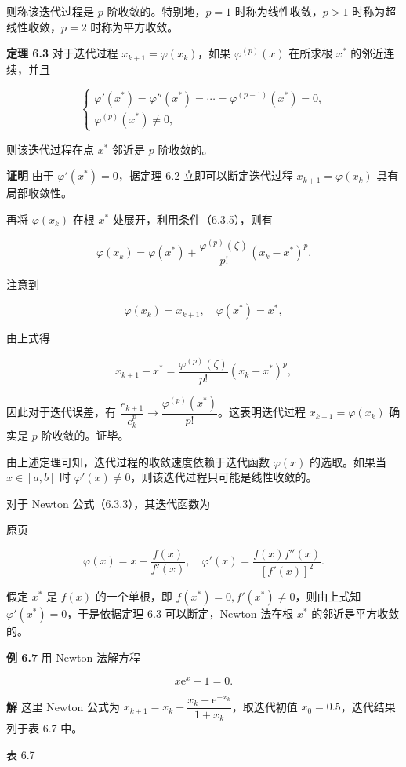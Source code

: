 \documentclass[
  10pt,
  fontset=fandol]{ctexart}
\begin{document}
则称该迭代过程是 \(p\) 阶收敛的。特别地，\(p=1\) 时称为线性收敛，\(p>1\) 时称为超线性收敛，\(p=2\) 时称为平方收敛。

\textbf{定理 6.3} 对于迭代过程 \(x_{k+1}=\varphi(x_k)\)，如果 \(\varphi^{(p)}(x)\) 在所求根 \(x^*\) 的邻近连续，并且

\[
\begin{cases}
\varphi'(x^*)=\varphi''(x^*)=\cdots=\varphi^{(p-1)}(x^*)=0,\\
\varphi^{(p)}(x^*)\ne0,
\end{cases}
\tag{6.3.5}
\]

则该迭代过程在点 \(x^*\) 邻近是 \(p\) 阶收敛的。

\textbf{证明} 由于 \(\varphi'(x^*)=0\)，据定理 6.2 立即可以断定迭代过程 \(x_{k+1}=\varphi(x_k)\) 具有局部收敛性。

再将 \(\varphi(x_k)\) 在根 \(x^*\) 处展开，利用条件（6.3.5），则有

\[
\varphi(x_k)=\varphi(x^*)+\frac{\varphi^{(p)}(\zeta)}{p!}(x_k-x^*)^p.
\]

注意到

\[
\varphi(x_k)=x_{k+1},\quad\varphi(x^*)=x^*,
\]

由上式得

\[
x_{k+1}-x^*=\frac{\varphi^{(p)}(\zeta)}{p!}(x_k-x^*)^p,
\]

因此对于迭代误差，有 \(\dfrac{e_{k+1}}{e_k^p}\to\dfrac{\varphi^{(p)}(x^*)}{p!}\)。这表明迭代过程 \(x_{k+1}=\varphi(x_k)\) 确实是 \(p\) 阶收敛的。证毕。

由上述定理可知，迭代过程的收敛速度依赖于迭代函数 \(\varphi(x)\) 的选取。如果当 \(x\in[a,b]\) 时 \(\varphi'(x)\ne0\)，则该迭代过程只可能是线性收敛的。

对于 Newton 公式（6.3.3），其迭代函数为

\href{../../source-images/pdf-165.jpeg}{原页}

\[
\varphi(x)=x-\frac{f(x)}{f'(x)},\quad\varphi'(x)=\frac{f(x)f''(x)}{[f'(x)]^2}.
\]

假定 \(x^*\) 是 \(f(x)\) 的一个单根，即 \(f(x^*)=0,f'(x^*)\ne0\)，则由上式知 \(\varphi'(x^*)=0\)，于是依据定理 6.3 可以断定，Newton 法在根 \(x^*\) 的邻近是平方收敛的。

\textbf{例 6.7} 用 Newton 法解方程

\[
x\mathrm{e}^x-1=0.
\tag{6.3.6}
\]

\textbf{解} 这里 Newton 公式为 \(x_{k+1}=x_k-\dfrac{x_k-\mathrm{e}^{-x_k}}{1+x_k}\)，取迭代初值 \(x_0=0.5\)，迭代结果列于表 6.7 中。

表 6.7
\end{document}
